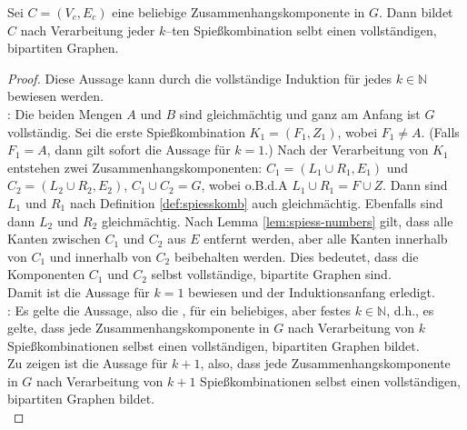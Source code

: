 \begin{lemma}\label{lem:komponente-complete}
Sei $C = (V_c, E_c)$ eine beliebige Zusammenhangskomponente in $G$. 
Dann bildet $C$ nach Verarbeitung jeder $k$--ten Spießkombination
selbt einen vollständigen, bipartiten Graphen.
\end{lemma}

\begin{proof}
Diese Aussage kann durch die vollständige Induktion für jedes $k \in \mathbb{N}$ bewiesen werden.\\

\noindent
{}: 
Die beiden Mengen $A$ und $B$ sind gleichmächtig und ganz am Anfang ist $G$ vollständig.
Sei die erste Spießkombination $K_1 = (F_1, Z_1)$, wobei $F_1 \neq A$. (Falls $F_1 = A$,
dann gilt sofort die Aussage für $k = 1$.)
Nach der Verarbeitung von $K_1$ 
entstehen zwei Zusammenhangskomponenten: $C_1 = (L_1 \cup R_1, E_1)$ und $C_2 = (L_2 \cup R_2, E_2)$,
$C_1 \cup C_2 = G$, wobei o.B.d.A $L_1 \cup R_1 = F \cup Z$.
Dann sind $L_1$ und $R_1$
nach Definition \ref{def:spiesskomb} auch gleichmächtig. 
Ebenfalls sind dann $L_2$ und $R_2$ gleichmächtig.
Nach Lemma \ref{lem:spiess-numbers} gilt, dass alle Kanten zwischen $C_1$ und $C_2$
aus $E$ entfernt werden, aber alle Kanten innerhalb von $C_1$ und innerhalb von $C_2$
beibehalten werden.
Dies bedeutet, dass die Komponenten $C_1$ und $C_2$ selbst vollständige, bipartite Graphen sind.\\
Damit ist die Aussage für $k = 1$ bewiesen und der Induktionsanfang erledigt.\\

\noindent
{}: Es gelte die Aussage, also die ,
für ein beliebiges, aber festes $k \in \mathbb{N}$, d.h., es gelte,
dass jede Zusammenhangskomponente in $G$ nach Verarbeitung von $k$ Spießkombinationen selbst
einen vollständigen, bipartiten Graphen bildet.\\

Zu zeigen ist die Aussage für $k + 1$, also, dass jede Zusammenhangskomponente in $G$ nach Verarbeitung
von $k + 1$ Spießkombinationen selbst einen vollständigen, bipartiten Graphen bildet.\\


\end{proof}
